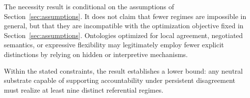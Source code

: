 The necessity result is conditional on the assumptions of Section~\ref{sec:assumptions}.
It does not claim that fewer regimes are impossible in general, but that they
are incompatible with the optimization objective fixed in Section~\ref{sec:assumptions}.
Ontologies optimized for local agreement, negotiated semantics, or expressive
flexibility may legitimately employ fewer explicit distinctions by relying on
hidden or interpretive mechanisms.

Within the stated constraints,
the result establishes a lower
bound: any neutral substrate capable of supporting accountability under
persistent disagreement must realize at least nine distinct
referential regimes.
